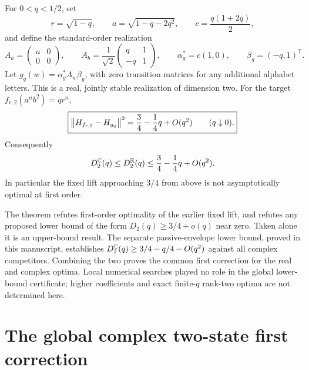 \begin{theorem}
\label{I:F:thm:f2-improvement}
For $0<q<1/2$, set
\[
 r=\sqrt{1-q},\qquad a=\sqrt{1-q-2q^2},\qquad
 c=\frac{q(1+2q)}2,
\]
and define the standard-order realization
\begin{equation}
 A_a=\begin{pmatrix}a&0\\0&0\end{pmatrix},\qquad
 A_b=\frac1{\sqrt2}\begin{pmatrix}q&1\\-q&1\end{pmatrix},\qquad
 \alpha_g^*=c(1,0),\qquad \beta_g=(-q,1)^{\mathsf T}.
 \label{I:F:eq:f2-branch}
\end{equation}
Let $g_q(w)=\alpha_g^*A_w\beta_g$, with zero transition matrices for any
additional alphabet letters. This is a real, jointly stable realization
of dimension two. For the target $f_{r,2}(a^n b^2)=qr^n$,
\begin{equation}
 \boxed{\displaystyle
 \left\lVert H_{f_{r,2}}-H_{g_q}\right\rVert^2
 =\frac34-\frac14q+O(q^2)\qquad(q\downarrow0).}
 \label{I:F:eq:f2-branch-expansion}
\end{equation}
Consequently
\begin{equation}
 D_2^{\mathbb C}(q)\le D_2^{\mathbb R}(q)
 \le\frac34-\frac14q+O(q^2).
 \label{I:F:eq:f2-optimum-upper}
\end{equation}
In particular the fixed lift approaching $3/4$ from above is not
asymptotically optimal at first order.
\end{theorem}



\begin{remark}
The theorem refutes first-order optimality of the earlier fixed lift,
and refutes any proposed lower bound of the form
$D_2(q)\ge3/4+o(q)$ near zero. Taken alone it is an upper-bound result. The separate passive-envelope
lower bound, proved in this manuscript, establishes
$D_2^{\mathbb C}(q)\ge3/4-q/4-O(q^2)$ against all complex competitors.
Combining the two proves the common first correction for the real and
complex optima. Local numerical searches played no role in the global
lower-bound certificate; higher coefficients and exact finite-$q$
rank-two optima are not determined here.
\end{remark}

\section{The global complex two-state first correction}
\label{I:F:sec:f2-global-lower}

